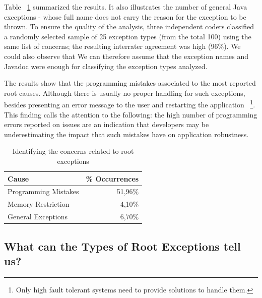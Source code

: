 \documentclass[conference]{IEEEtran}
\begin{document}
Table ~\ref{tab:causes} summarized the results. It also illustrates the number of general Java exceptions - 
whose full name does not carry the reason for the exception to be thrown.
To ensure the quality of the analysis, three independent coders classified a randomly selected
sample of 25 exception types (from the total 100) using the same list of concerns;
the resulting interrater agreement was high (96\%). We could also observe that
We can therefore assume that the exception names and Javadoc 
were enough for classifying the exception types analyzed. 

The results show that the programming mistakes associated to the most reported root causes. 
Although there is usually no proper handling for such exceptions, 
besides presenting an error message to the user and restarting the application ~\footnote{Only 
high fault tolerant systems need to provide solutions to handle them.}.  
This finding calls the attention to the following: the high number of programming errors reported 
on issues are an indication that developers may be underestimating the impact that such 
mistakes have on application robustness.

\begin{table}
  \centering
  \begin{tabular}{lr}
    \hline
    \bfseries{Cause} &  \bfseries{\% Occurrences} \\
    \hline
      Programming Mistakes &  51,96\%\\ 
      Memory Restriction   &   4,10\% \\ 
      General Exceptions   &  6,70\%\\
    \hline
 \end{tabular}
  \caption{Identifying the concerns related to root exceptions}
  \label{tab:causes}
\end{table}



\noindent {}

\subsection{What can the Types of Root Exceptions tell us?}
\end{document}
